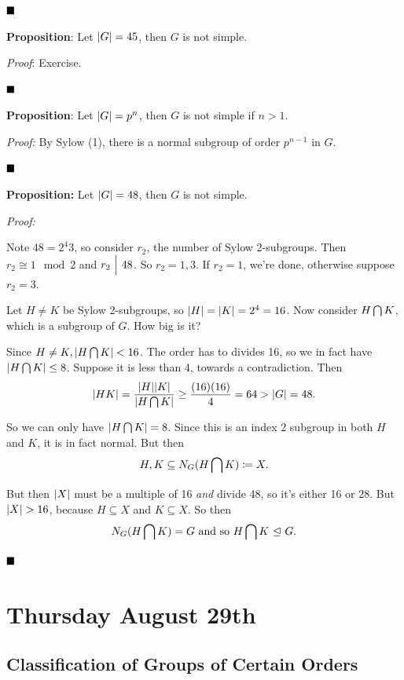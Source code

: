 \(\qed\)

\textbf{Proposition}: Let \({\left\lvert {G} \right\rvert} = 45\), then \(G\) is not simple.

\emph{Proof}: Exercise.

\(\qed\)

\textbf{Proposition}: Let \({\left\lvert {G} \right\rvert} = p^n\), then \(G\) is not simple if
\(n > 1\).

\emph{Proof:} By Sylow (1), there is a normal subgroup of order
\(p^{n-1}\) in \(G\).

\(\qed\)

\textbf{Proposition:} Let \({\left\lvert {G} \right\rvert} = 48\), then \(G\) is not simple.

\emph{Proof:}

Note \(48 = 2^4 3\), so consider \(r_2\), the number of Sylow
2-subgroups. Then \(r_2 \cong 1 \mod 2\) and \(r_2 {~\Bigm| ~} 48\). So
\(r_2 = 1, 3\). If \(r_2 = 1\), we're done, otherwise suppose
\(r_2 = 3\).

Let \(H \neq K\) be Sylow 2-subgroups, so
\({\left\lvert {H} \right\rvert} = {\left\lvert {K} \right\rvert} = 2^4 = 16\). Now consider \(H \bigcap K\), which
is a subgroup of \(G\). How big is it?

Since \(H\neq K, {\left\lvert {H \bigcap K} \right\rvert} < 16\). The order has to divides
16, so we in fact have \({\left\lvert {H \bigcap K} \right\rvert} \leq 8\). Suppose it is
less than 4, towards a contradiction. Then \[
{\left\lvert {HK} \right\rvert} = \frac{{\left\lvert {H} \right\rvert} {\left\lvert {K} \right\rvert}}{{\left\lvert {H \bigcap K} \right\rvert}} \geq \frac{(16)(16)}{4} = 64 > {\left\lvert {G} \right\rvert} = 48.
\]

So we can only have \({\left\lvert {H \bigcap K} \right\rvert} = 8\). Since this is an index
2 subgroup in both \(H\) and \(K\), it is in fact normal. But then \[
H, K \subseteq N_G(H \bigcap K) \coloneqq X
.\]

But then \({\left\lvert {X} \right\rvert}\) must be a multiple of 16 \emph{and} divide 48, so
it's either 16 or 28. But \({\left\lvert {X} \right\rvert} > 16\), because \(H \subseteq X\) and
\(K \subseteq X\). So then \[
N_G(H \bigcap K) = G \text{ and so } H \bigcap K {~\trianglelefteq~} G
.\]

\(\qed\)

\hypertarget{thursday-august-29th}{%
\section{Thursday August 29th}\label{thursday-august-29th}}

\hypertarget{classification-of-groups-of-certain-orders}{%
\subsection{Classification of Groups of Certain
Orders}\label{classification-of-groups-of-certain-orders}}

